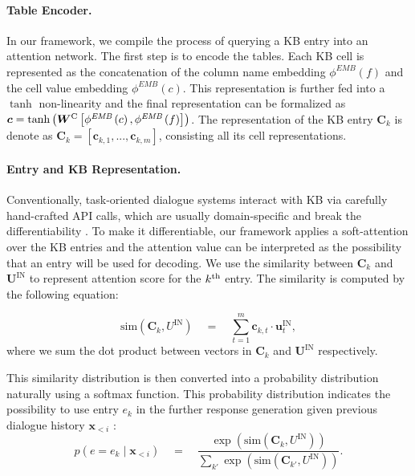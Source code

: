 \documentclass[11pt]{article}
\begin{document}
\paragraph{Table Encoder.}
In our framework, we compile the process of querying  a KB entry into an attention network. The first step is to encode the tables.
Each KB cell is represented as the concatenation of the column name embedding $\phi^\textit{EMB}(f)$ and the cell value embedding $\phi^\textit{EMB}(c)$.
This representation is further fed into a $\tanh$ non-linearity and the final representation can be formalized as $\boldsymbol c = \tanh \left(\boldsymbol W^\text C \left[ \phi^\textit{EMB}\left(c\right), \phi^\textit{EMB}\left(f\right)\right]\right)$.
The representation of the KB entry $\boldsymbol{C}_k$ is denote as $\boldsymbol C_k = [\boldsymbol c_{k,1}, ..., \boldsymbol c_{k,m}]$, consisting all its cell representations.


\paragraph{Entry and KB Representation.}
\label{KB}
Conventionally, task-oriented dialogue systems interact with KB via carefully hand-crafted API calls, which are usually domain-specific and break the differentiability \cite{wen:2017:EACL}. To make it differentiable, our framework applies a soft-attention over the KB entries and the attention value can be interpreted as the possibility that an entry will be used for decoding. 
	We use the similarity between $\boldsymbol C_k$ and $\boldsymbol U^{\text{IN}}$ to represent attention score for the $k^{\rm th}$ entry. 
	The similarity is computed by the following equation:

\[
\text{sim}\left(\boldsymbol C_k, U^{\text{IN}}\right) \quad=\quad \sum_{t = 1}^{m}{\boldsymbol c_{k,t}\cdot \boldsymbol u^{\text{IN}}_{t}},
\]
where we sum the dot product between vectors in $\boldsymbol C_k$ and $\boldsymbol U^{\text{IN}}$ respectively. 

This similarity distribution is then converted into a probability distribution naturally using a softmax function. This probability distribution indicates the possibility to use entry $e_k$ in the further response generation given previous dialogue history $\boldsymbol x_{<i}$ :
\[p(e = e_k\mid \boldsymbol x_{<i}) \quad=\quad \frac{\exp\left(\text{sim}\left(\boldsymbol C_k, U^{\text{IN}}\right)\right)}{\sum_{k'}\exp\left( \text{sim}\left(\boldsymbol C_{k'}, U^{\text{IN}}\right)\right)}.
\]
\end{document}
